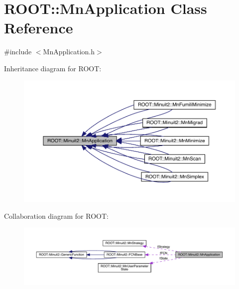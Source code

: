 \hypertarget{classROOT_1_1Minuit2_1_1MnApplication}{}\section{R\+O\+OT\+:\+:Mn\+Application Class Reference}
\label{classROOT_1_1Minuit2_1_1MnApplication}


{\ttfamily \#include $<$Mn\+Application.\+h$>$}



Inheritance diagram for R\+O\+OT\+:
\nopagebreak
\begin{figure}[H]
\begin{center}
\leavevmode
\includegraphics[width=350pt]{de/d0b/classROOT_1_1Minuit2_1_1MnApplication__inherit__graph}
\end{center}
\end{figure}


Collaboration diagram for R\+O\+OT\+:
\nopagebreak
\begin{figure}[H]
\begin{center}
\leavevmode
\includegraphics[width=350pt]{d1/ddf/classROOT_1_1Minuit2_1_1MnApplication__coll__graph}
\end{center}
\end{figure}
